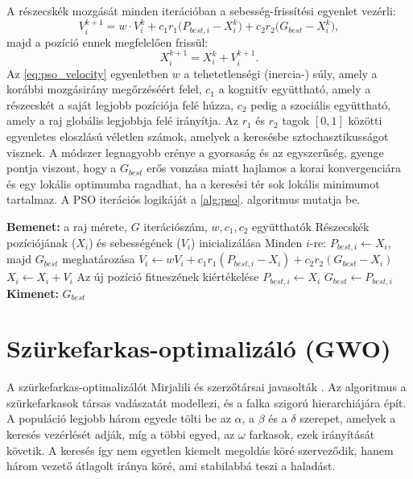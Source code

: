 A részecskék mozgását minden iterációban a sebesség-frissítési egyenlet vezérli:
\begin{equation}
V_i^{k+1} = w \cdot V_i^k + c_1 r_1 \bigl(P_{best,i} - X_i^k\bigr) + c_2 r_2 \bigl(G_{best} - X_i^k\bigr),
\label{eq:pso_velocity}
\end{equation}
majd a pozíció ennek megfelelően frissül:
\begin{equation}
X_i^{k+1} = X_i^k + V_i^{k+1}.
\label{eq:pso_position}
\end{equation}
Az \eqref{eq:pso_velocity} egyenletben $w$ a tehetetlenségi (inercia-) súly, amely a korábbi mozgásirány megőrzéséért felel, $c_1$ a kognitív együttható, amely a részecskét a saját legjobb pozíciója felé húzza, $c_2$ pedig a szociális együttható, amely a raj globális legjobbja felé irányítja. Az $r_1$ és $r_2$ tagok $[0,1]$ közötti egyenletes eloszlású véletlen számok, amelyek a keresésbe sztochasztikusságot visznek. A módszer legnagyobb erénye a gyorsaság és az egyszerűség, gyenge pontja viszont, hogy a $G_{best}$ erős vonzása miatt hajlamos a korai konvergenciára és egy lokális optimumba ragadhat, ha a keresési tér sok lokális minimumot tartalmaz. A PSO iterációs logikáját a \ref{alg:pso}. algoritmus mutatja be.
\begin{algorithm}[H]
\caption{Részecskeraj-optimalizálás (PSO)}
\label{alg:pso}
\begin{algorithmic}[1]
\State \textbf{Bemenet:} a raj mérete, $G$ iterációszám, $w, c_1, c_2$ együtthatók
\State Részecskék pozíciójának ($X_i$) és sebességének ($V_i$) inicializálása
\State Minden $i$-re: $P_{best,i} \gets X_i$, majd $G_{best}$ meghatározása
        \State $V_i \gets w V_i + c_1 r_1 (P_{best,i} - X_i) + c_2 r_2 (G_{best} - X_i)$
        \State $X_i \gets X_i + V_i$
        \State Az új pozíció fitneszének kiértékelése
            \State $P_{best,i} \gets X_i$
        \EndIf
            \State $G_{best} \gets P_{best,i}$
        \EndIf
    \EndFor
\EndFor
\State \textbf{Kimenet:} $G_{best}$
\end{algorithmic}
\end{algorithm}

\section{Szürkefarkas-optimalizáló (GWO)}
A szürkefarkas-optimalizálót Mirjalili és szerzőtársai javasolták \cite{MirjaliliGWO2014}. Az algoritmus a szürkefarkasok társas vadászatát modellezi, és a falka szigorú hierarchiájára épít. A populáció legjobb három egyede tölti be az $\alpha$, a $\beta$ és a $\delta$ szerepet, amelyek a keresés vezérlését adják, míg a többi egyed, az $\omega$ farkasok, ezek irányítását követik. A keresés így nem egyetlen kiemelt megoldás köré szerveződik, hanem három vezető átlagolt iránya köré, ami stabilabbá teszi a haladást.

